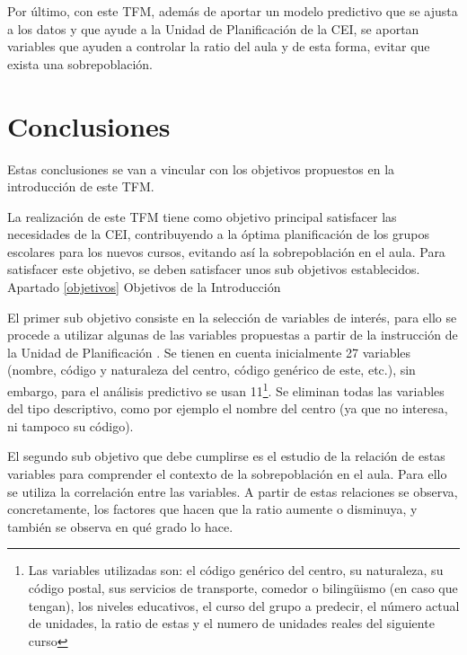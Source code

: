 Por último, con este TFM, además de aportar un modelo predictivo que se ajusta a los datos y que ayude a la Unidad de Planificación de la CEI, se aportan variables que ayuden a controlar la ratio del aula y de esta forma, evitar que exista una sobrepoblación. 



\section{Conclusiones}
Estas conclusiones se van a vincular con los objetivos propuestos en la introducción de este TFM.

La realización de este TFM tiene como objetivo principal satisfacer las necesidades de la CEI, contribuyendo a la óptima planificación de los grupos escolares para los nuevos cursos, evitando así la sobrepoblación en el aula. Para satisfacer este objetivo, se deben satisfacer unos sub objetivos establecidos. Apartado \ref{objetivos} Objetivos de la Introducción 

El primer sub objetivo consiste en la selección de variables de interés, para ello se procede a utilizar algunas de las variables propuestas a partir de la instrucción de la Unidad de Planificación \cite{INSTRCONSE}. Se tienen en cuenta inicialmente 27 variables (nombre, código y naturaleza del centro, código genérico de este, etc.), sin embargo, para el análisis predictivo se usan 11\footnote{Las variables utilizadas son: el código genérico del centro, su naturaleza, su código postal, sus servicios de transporte, comedor o bilingüismo (en caso que tengan), los niveles educativos, el curso del grupo a predecir, el número actual de unidades, la ratio de estas y el numero de unidades reales del siguiente curso}. Se eliminan todas las variables del tipo descriptivo, como por ejemplo el nombre del centro (ya que no interesa, ni tampoco su código).

El segundo sub objetivo que debe cumplirse es el estudio de la relación de estas variables para comprender el contexto de la sobrepoblación en el aula. Para ello se utiliza la correlación entre las variables. A partir de estas relaciones se observa, concretamente, los factores que hacen que la ratio aumente o disminuya, y también se observa en qué grado lo hace. 

